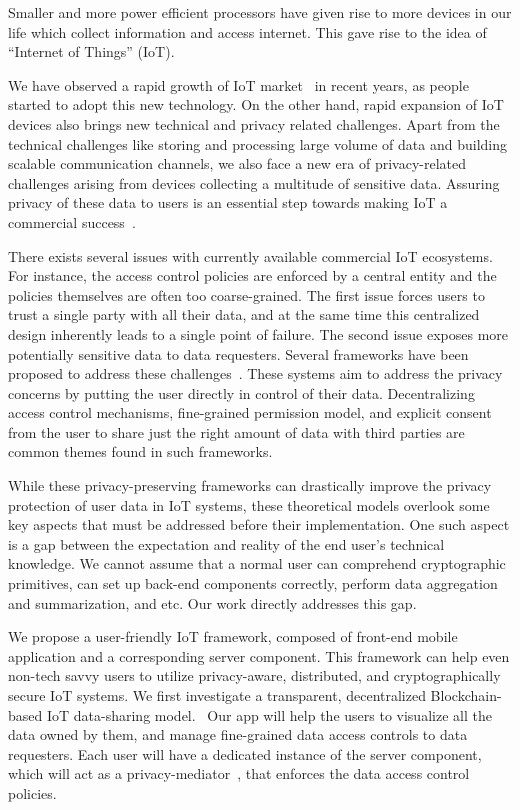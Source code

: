 Smaller and more power efficient processors have given rise to more devices in our life which collect information and access internet. This gave rise to the idea of ``Internet of Things'' (IoT).

We have observed a rapid growth of IoT market~\cite{idc} in recent years, as people started to adopt this new technology. On the other hand, rapid expansion of IoT devices also brings new technical and privacy related challenges. Apart from the technical challenges like storing and processing large volume of data and building scalable communication channels, we also face a new era of privacy-related challenges arising from devices collecting a multitude of sensitive data. Assuring privacy of these data to users is an essential step towards making IoT a commercial success~\cite{davies}.

There exists several issues with currently available commercial IoT ecosystems. For instance, the access control policies are enforced by a central entity and the policies themselves are often too coarse-grained. The first issue forces users to trust a single party with all their data, and at the same time this centralized design inherently leads to a single point of failure. The second issue exposes more potentially sensitive data  to data requesters. Several frameworks have been proposed to address these challenges~\cite{campbell,davies}. These systems aim to address the privacy concerns by putting the user directly in control of their data. Decentralizing access control mechanisms, fine-grained permission model, and explicit consent from the user to share just the right amount of data with third parties are common themes found in such frameworks.

While these privacy-preserving frameworks can drastically improve the privacy protection of user data in IoT systems, these theoretical models overlook some key aspects that must be addressed before their implementation. One such aspect is a gap between the expectation and reality of the end user's technical knowledge. We cannot assume that a normal user can comprehend cryptographic primitives, can set up back-end components correctly, perform data aggregation and summarization, and etc. Our work directly addresses this gap.

We propose a user-friendly IoT framework, composed of front-end mobile application and a corresponding server component. This framework can help even non-tech savvy users to  utilize privacy-aware, distributed, and cryptographically secure IoT systems. We first investigate a transparent, decentralized Blockchain-based IoT data-sharing model.~\cite{campbell} Our app will help the users to visualize all the data owned by them, and manage fine-grained data access controls to data requesters. Each user will have a dedicated instance of the server component, which will act as a privacy-mediator~\cite{davies}, that enforces the data access control policies.

